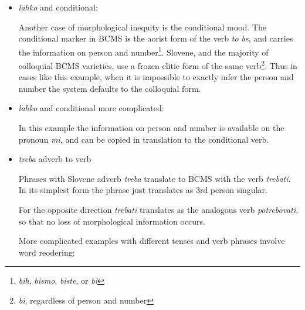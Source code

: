 \begin{itemize}
\item \emph{lahko} and conditional:

Another case of morphological inequity is the conditional
mood. The conditional marker in BCMS is the aorist form of the verb
\emph{to be}, and carries the information on person and
number\footnote{\emph{bih}, \emph{bismo}, \emph{biste}, or \emph{bi}}. Slovene, and the majority of colloquial BCMS varieties, use
a frozen clitic form of the same verb\footnote{\emph{bi}, regardless of person and
number}. Thus in cases like this example, when it is impossible to
exactly infer the person and number the system defaults to the
colloquial form.

\item \emph{lahko} and conditional more complicated:

In this example the information on person and number is available
on the pronoun \emph{mi}, and can be copied in translation to the
conditional verb.

\item \emph{treba} adverb to verb

Phrases with Slovene adverb \emph{treba} translate to BCMS with the
verb \emph{trebati}. In its simplest form the phrase just translates
as 3rd person singular.

For the opposite direction \emph{trebati} translates as the analogous
verb \emph{potrebovati}, so that no loss of morphological information occurs.


More complicated examples with different tenses and verb phrases involve word reodering:


\end{itemize}
